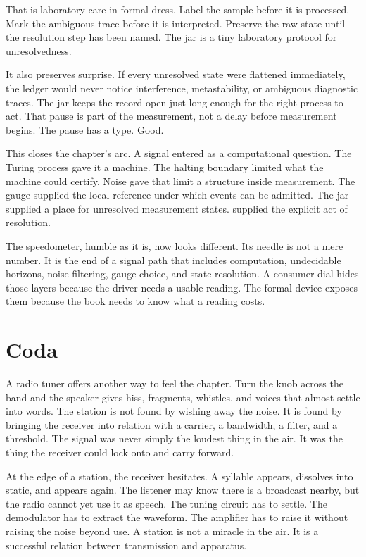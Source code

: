That is laboratory care in formal dress. Label the sample before it is
processed. Mark the ambiguous trace before it is interpreted. Preserve the raw
state until the resolution step has been named. The jar is a tiny laboratory
protocol for unresolvedness.

It also preserves surprise. If every unresolved state were flattened
immediately, the ledger would never notice interference, metastability, or
ambiguous diagnostic traces. The jar keeps the record open just long enough for
the right process to act.
That pause is part of the measurement, not a delay before measurement begins.
The pause has a type.
Good.

This closes the chapter's arc. A signal entered as a computational question.
The Turing process gave it a machine. The halting boundary limited what the
machine could certify. Noise gave that limit a structure inside measurement.
The gauge supplied the local reference under which events can be admitted. The
jar supplied a place for unresolved measurement states.  supplied
the explicit act of resolution.

The speedometer, humble as it is, now looks different. Its needle is not a
mere number. It is the end of a signal path that includes computation,
undecidable horizons, noise filtering, gauge choice, and state resolution. A
consumer dial hides those layers because the driver needs a usable reading.
The formal device exposes them because the book needs to know what a reading
costs.

\section*{Coda}

A radio tuner offers another way to feel the chapter. Turn the knob across the
band and the speaker gives hiss, fragments, whistles, and voices that almost
settle into words. The station is not found by wishing away the noise. It is
found by bringing the receiver into relation with a carrier, a bandwidth, a
filter, and a threshold. The signal was never simply the loudest thing in the
air. It was the thing the receiver could lock onto and carry forward.

At the edge of a station, the receiver hesitates. A syllable appears, dissolves
into static, and appears again. The listener may know there is a broadcast
nearby, but the radio cannot yet use it as speech. The tuning circuit has to
settle. The demodulator has to extract the waveform. The amplifier has to
raise it without raising the noise beyond use. A station is not a miracle in
the air. It is a successful relation between transmission and apparatus.

